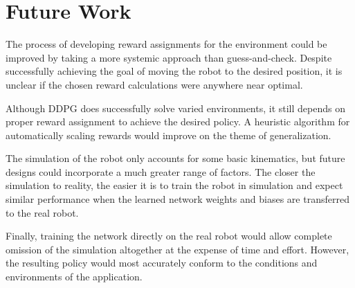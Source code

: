 \section{Future Work}
The process of developing reward assignments for the environment could be improved by taking a more systemic approach than guess-and-check. Despite successfully achieving the goal of moving the robot to the desired position, it is unclear if the chosen reward calculations were anywhere near optimal. 

Although DDPG does successfully solve varied environments, it still depends on proper reward assignment to achieve the desired policy. A heuristic algorithm for automatically scaling rewards would improve on the theme of generalization. 

The simulation of the robot only accounts for some basic kinematics, but future designs could incorporate a much greater range of factors. The closer the simulation to reality, the easier it is to train the robot in simulation and expect similar performance when the learned network weights and biases are transferred to the real robot.

Finally, training the network directly on the real robot would allow complete omission of the simulation altogether at the expense of time and effort. However, the resulting policy would most accurately conform to the conditions and environments of the application.